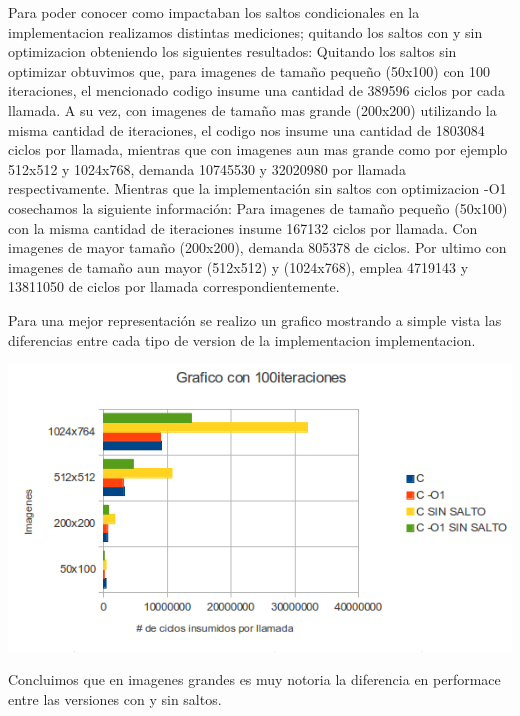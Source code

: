  Para poder conocer como impactaban los saltos condicionales en la implementacion realizamos distintas mediciones;
 quitando los saltos con y sin optimizacion obteniendo los siguientes resultados:
 Quitando los saltos sin optimizar obtuvimos que, para imagenes de tamaño pequeño (50x100) con 100 iteraciones, el mencionado codigo insume
 una cantidad de 389596 ciclos por cada llamada. A su vez, con imagenes de tamaño mas grande (200x200) utilizando la misma cantidad de iteraciones,
 el codigo nos insume  una cantidad de 1803084 ciclos por llamada, mientras que con imagenes aun mas grande como por ejemplo 512x512 y 1024x768, demanda
 10745530 y 32020980 por llamada respectivamente.
 \vspace*{0.3cm} 
 Mientras que la implementación sin saltos con optimizacion -O1 cosechamos la siguiente información:
 Para imagenes de tamaño pequeño (50x100) con la misma cantidad de iteraciones insume 167132 ciclos por llamada. 
 Con imagenes de mayor tamaño (200x200), demanda 805378 de ciclos.
 Por ultimo con imagenes de tamaño aun mayor (512x512) y (1024x768), emplea 4719143 y 13811050 de ciclos por llamada correspondientemente.
  \vspace*{0.3cm}
 
  Para una mejor representación se realizo un grafico mostrando a simple vista
  las diferencias entre cada tipo de version de la implementacion implementacion.
 \vspace*{0.3cm} \vspace*{0.3cm}
  \begin{center}
 \includegraphics[scale=0.7]{popartbien.png}
 \end{center}
  \vspace*{0.3cm} 

  Concluimos que en imagenes grandes es muy notoria la diferencia en performace entre las versiones con y sin saltos.

